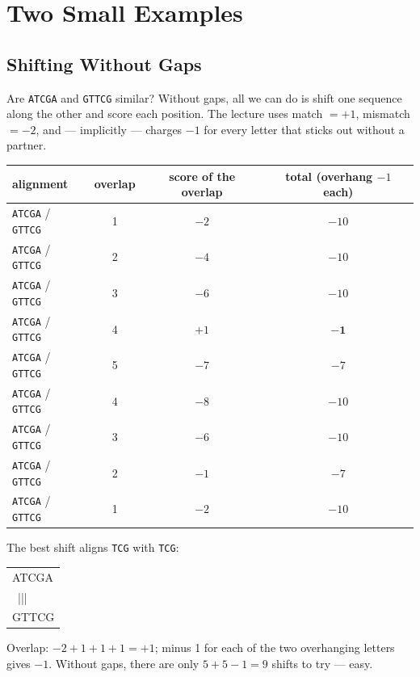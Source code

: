 \documentclass[11pt, oneside]{book}
\makeatletter
\newcommand{\seq}[1]{\texttt{#1}}
\newcommand{\alnblock}[1]{%
  \par\smallskip
  {\centering\ttfamily\small
   \begin{tabular}{@{}l@{}}#1\end{tabular}\par}%
  \smallskip}
\let\originalsection\section
\renewcommand{\section}{\Needspace{7\baselineskip}\originalsection}
\let\originalsubsection\subsection
\renewcommand{\subsection}{\Needspace{6\baselineskip}\originalsubsection}
\makeatother
\begin{document}
\section{Two Small Examples}

\subsection{Shifting Without Gaps}

Are \seq{ATCGA} and \seq{GTTCG} similar? Without gaps, all we can do is shift
one sequence along the other and score each position. The lecture uses
match $= +1$, mismatch $= -2$, and --- implicitly --- charges $-1$ for every
letter that sticks out without a partner.

\begin{exbox}[title={All shifts of \seq{GTTCG} against \seq{ATCGA}}]
\centering
\small
\begin{tabular}{@{}lccc@{}}
\toprule
alignment & overlap & score of the overlap & total (overhang $-1$ each) \\
\midrule
\seq{\phantom{GTTC}ATCGA} / \seq{GTTCG\phantom{ATCG}}   & 1 & $-2$ & $-10$ \\
\seq{\phantom{GTT}ATCGA} / \seq{GTTCG\phantom{ATC}}     & 2 & $-4$ & $-10$ \\
\seq{\phantom{GT}ATCGA} / \seq{GTTCG\phantom{AT}}       & 3 & $-6$ & $-10$ \\
\seq{\phantom{G}ATCGA} / \seq{GTTCG\phantom{A}}         & 4 & $+1$ & $\mathbf{-1}$ \\
\seq{ATCGA} / \seq{GTTCG}                               & 5 & $-7$ & $-7$ \\
\seq{ATCGA\phantom{G}} / \seq{\phantom{A}GTTCG}         & 4 & $-8$ & $-10$ \\
\seq{ATCGA\phantom{GT}} / \seq{\phantom{AT}GTTCG}       & 3 & $-6$ & $-10$ \\
\seq{ATCGA\phantom{GTT}} / \seq{\phantom{ATC}GTTCG}     & 2 & $-1$ & $-7$ \\
\seq{ATCGA\phantom{GTTC}} / \seq{\phantom{ATCG}GTTCG}   & 1 & $-2$ & $-10$ \\
\bottomrule
\end{tabular}

\raggedright
\medskip
The best shift aligns \seq{TCG} with \seq{TCG}:

\alnblock{%
\phantom{G}ATCGA\\
\phantom{G}~|||~\\
GTTCG\phantom{A}}

Overlap: $-2 + 1 + 1 + 1 = +1$; minus 1 for each of the two overhanging
letters gives $-1$. Without gaps, there are only $5 + 5 - 1 = 9$ shifts to
try --- easy.
\end{exbox}
\end{document}
